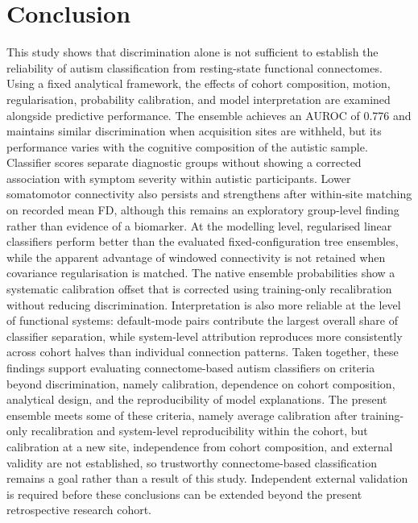 \section{Conclusion}
\label{sec:conclusion}

This study shows that discrimination alone is not sufficient to establish the reliability of autism classification from resting-state functional connectomes. Using a fixed analytical framework, the effects of cohort composition, motion, regularisation, probability calibration, and model interpretation are examined alongside predictive performance. The ensemble achieves an AUROC of 0.776 and maintains similar discrimination when acquisition sites are withheld, but its performance varies with the cognitive composition of the autistic sample. Classifier scores separate diagnostic groups without showing a corrected association with symptom severity within autistic participants. Lower somatomotor connectivity also persists and strengthens after within-site matching on recorded mean FD, although this remains an exploratory group-level finding rather than evidence of a biomarker. At the modelling level, regularised linear classifiers perform better than the evaluated fixed-configuration tree ensembles, while the apparent advantage of windowed connectivity is not retained when covariance regularisation is matched. The native ensemble probabilities show a systematic calibration offset that is corrected using training-only recalibration without reducing discrimination. Interpretation is also more reliable at the level of functional systems: default-mode pairs contribute the largest overall share of classifier separation, while system-level attribution reproduces more consistently across cohort halves than individual connection patterns. Taken together, these findings support evaluating connectome-based autism classifiers on criteria beyond discrimination, namely calibration, dependence on cohort composition, analytical design, and the reproducibility of model explanations. The present ensemble meets some of these criteria, namely average calibration after training-only recalibration and system-level reproducibility within the cohort, but calibration at a new site, independence from cohort composition, and external validity are not established, so trustworthy connectome-based classification remains a goal rather than a result of this study. Independent external validation is required before these conclusions can be extended beyond the present retrospective research cohort.